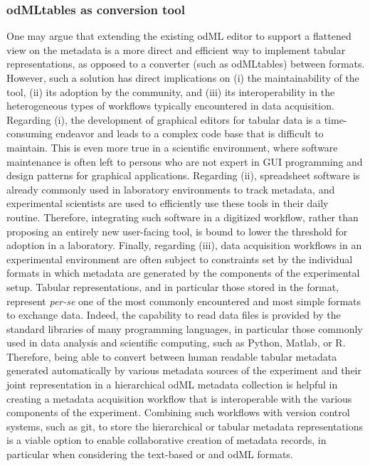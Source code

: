 \subsubsection{odMLtables as conversion tool}
One may argue that extending the existing odML editor to support a flattened view on the metadata is a more direct and efficient way to implement tabular representations, as opposed to a converter (such as odMLtables) between formats. However, such a solution has direct implications on (i) the maintainability of the tool, (ii) its adoption by the community, and (iii) its interoperability in the heterogeneous types of workflows typically encountered in data acquisition. Regarding (i), the development of graphical editors for tabular data  is a time-consuming endeavor and leads to a complex code base that is difficult to maintain. This is even more true in a scientific environment, where software maintenance is often left to persons who are not expert in GUI programming and design patterns for graphical applications. Regarding (ii), spreadsheet software is already commonly used in laboratory environments to track metadata, and experimental scientists are used to efficiently use these tools in their daily routine. Therefore, integrating such software in a digitized workflow, rather than proposing an entirely new user-facing tool, is bound to lower the threshold for adoption in a laboratory. Finally, regarding (iii), data acquisition workflows in an experimental environment are often subject to constraints set by the individual formats in which metadata are generated by the components of the experimental setup. Tabular representations, and in particular those stored in the  format, represent \textit{per-se} one of the most commonly encountered and most simple formats to exchange data. Indeed, the capability to read  data files is provided by the standard libraries of many programming languages, in particular those commonly used in data analysis and scientific computing, such as Python, Matlab, or R. Therefore, being able to convert between human readable tabular metadata generated automatically by various metadata sources of the experiment and their joint representation in a hierarchical odML metadata collection is helpful in creating a metadata acquisition workflow that is interoperable with the various components of the experiment. Combining such workflows with version control systems, such as git, to store the hierarchical or tabular metadata representations is a viable option to enable collaborative creation of metadata records, in particular when considering the text-based  or and odML formats.


